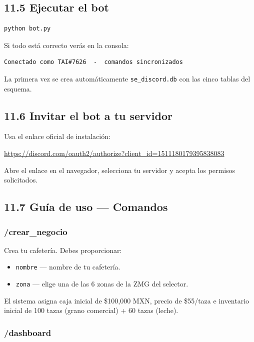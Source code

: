 \documentclass[12pt,spanish]{article}
\begin{document}
\subsection*{11.5 Ejecutar el bot}

\begin{lstlisting}[style=python, language={}]
python bot.py
\end{lstlisting}

Si todo está correcto verás en la consola:
\begin{lstlisting}[style=python, language={}]
Conectado como TAI#7626  -  comandos sincronizados
\end{lstlisting}

La primera vez se crea automáticamente \texttt{se\_discord.db} con las
cinco tablas del esquema.

\subsection*{11.6 Invitar el bot a tu servidor}

Usa el enlace oficial de instalación:

\begin{center}
  \url{https://discord.com/oauth2/authorize?client_id=1511180179395838083}
\end{center}

Abre el enlace en el navegador, selecciona tu servidor y acepta los permisos solicitados.

\subsection*{11.7 Guía de uso — Comandos}

\subsubsection*{/crear\_negocio}

Crea tu cafetería. Debes proporcionar:
\begin{itemize}
  \item \texttt{nombre} — nombre de tu cafetería.
  \item \texttt{zona} — elige una de las 6 zonas de la ZMG del selector.
\end{itemize}

El sistema asigna caja inicial de \$100,000 MXN, precio de \$55/taza
e inventario inicial de 100 tazas (grano comercial) + 60 tazas (leche).

\subsubsection*{/dashboard}
\end{document}
